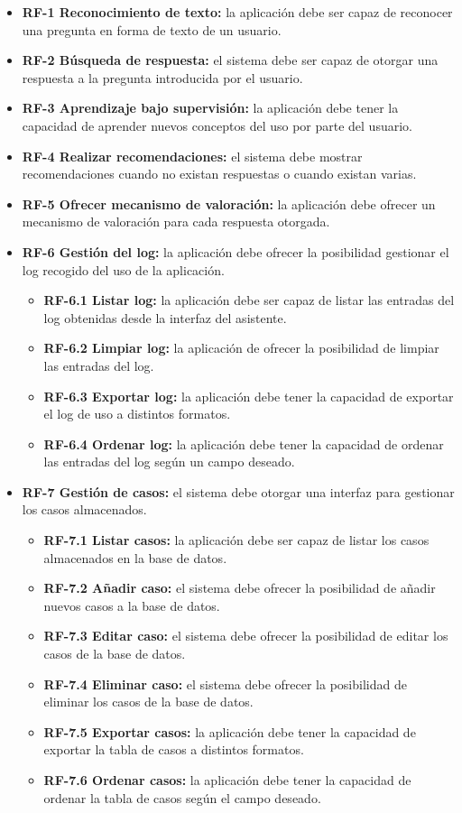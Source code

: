 \begin{itemize}
\tightlist
\item
\textbf{RF-1 Reconocimiento de texto:} la aplicación debe ser capaz de reconocer una pregunta en forma de texto de un usuario.
\item
\textbf{RF-2 Búsqueda de respuesta:} el sistema debe ser capaz de otorgar una respuesta a la pregunta introducida por el usuario.
\item
\textbf{RF-3 Aprendizaje bajo supervisión:} la aplicación debe tener la capacidad de aprender nuevos conceptos del uso por parte del usuario.
\item
\textbf{RF-4 Realizar recomendaciones:} el sistema debe mostrar recomendaciones cuando no existan respuestas o cuando existan varias.
\item
\textbf{RF-5 Ofrecer mecanismo de valoración:} la aplicación debe ofrecer un mecanismo de valoración para cada respuesta otorgada.
\item
\textbf{RF-6 Gestión del log:} la aplicación debe ofrecer la posibilidad gestionar el log recogido del uso de la aplicación.
	\begin{itemize}
	\tightlist
	\item
	\textbf{RF-6.1 Listar log:} la aplicación debe ser capaz de listar las entradas del log obtenidas desde la interfaz del asistente.
	\item
	\textbf{RF-6.2 Limpiar log:} la aplicación de ofrecer la posibilidad de limpiar las entradas del log.	
	\item
	\textbf{RF-6.3 Exportar log:} la aplicación debe tener la capacidad de exportar el log de uso a distintos formatos.
	\item
	\textbf{RF-6.4 Ordenar log:} la aplicación debe tener la capacidad de ordenar las entradas del log según un campo deseado.
	\end{itemize}
\item
\textbf{RF-7 Gestión de casos:} el sistema debe otorgar una interfaz para gestionar los casos almacenados.
	\begin{itemize}
	\tightlist
	\item
	\textbf{RF-7.1 Listar casos:} la aplicación debe ser capaz de listar los casos almacenados en la base de datos.
	\item
	\textbf{RF-7.2 Añadir caso:} el sistema debe ofrecer la posibilidad de añadir nuevos casos a la base de datos.
	\item
	\textbf{RF-7.3 Editar caso:} el sistema debe ofrecer la posibilidad de editar los casos de la base de datos.
	\item
	\textbf{RF-7.4 Eliminar caso:} el sistema debe ofrecer la posibilidad de eliminar los casos de la base de datos.
	\item
	\textbf{RF-7.5 Exportar casos:} la aplicación debe tener la capacidad de exportar la tabla de casos a distintos formatos.
	\item
	\textbf{RF-7.6 Ordenar casos:} la aplicación debe tener la capacidad de ordenar la tabla de casos según el campo deseado.
	\end{itemize}


\end{itemize}
